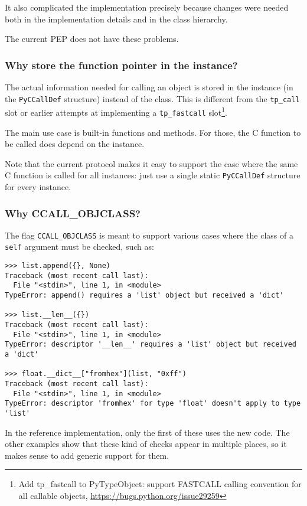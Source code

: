 It also complicated the implementation precisely because changes were
needed both in the implementation details and in the class hierarchy.

The current PEP does not have these problems.

\subsubsection{Why store the function pointer in the instance?}

The actual information needed for calling an object is stored in the
instance (in the \texttt{PyCCallDef} structure) instead of the class.
This is different from the \texttt{tp\_call} slot or earlier attempts at
implementing a \texttt{tp\_fastcall} slot\footnote{Add tp\_fastcall to
  PyTypeObject: support FASTCALL calling convention for all callable
  objects, \url{https://bugs.python.org/issue29259}}.

The main use case is built-in functions and methods. For those, the C
function to be called does depend on the instance.

Note that the current protocol makes it easy to support the case where
the same C function is called for all instances: just use a single
static \texttt{PyCCallDef} structure for every instance.

\subsubsection{Why CCALL\_OBJCLASS?}

The flag \texttt{CCALL\_OBJCLASS} is meant to support various cases
where the class of a \texttt{self} argument must be checked, such as:

\begin{verbatim}
>>> list.append({}, None)
Traceback (most recent call last):
  File "<stdin>", line 1, in <module>
TypeError: append() requires a 'list' object but received a 'dict'

>>> list.__len__({})
Traceback (most recent call last):
  File "<stdin>", line 1, in <module>
TypeError: descriptor '__len__' requires a 'list' object but received a 'dict'

>>> float.__dict__["fromhex"](list, "0xff")
Traceback (most recent call last):
  File "<stdin>", line 1, in <module>
TypeError: descriptor 'fromhex' for type 'float' doesn't apply to type 'list'
\end{verbatim}

In the reference implementation, only the first of these uses the new
code. The other examples show that these kind of checks appear in
multiple places, so it makes sense to add generic support for them.

